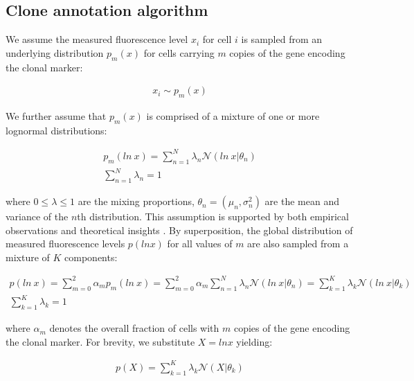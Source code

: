 \documentclass[10pt,letterpaper]{article}
\begin{document}
\subsection*{Clone annotation algorithm} 

We assume the measured fluorescence level $x_i$ for cell $i$ is sampled from an underlying distribution $p_m(x)$ for cells carrying $m$ copies of the gene encoding the clonal marker:
\begin{linenomath} \begin{gather}
x_i \sim p_m(x)
\end{gather} \end{linenomath}
We further assume that $p_m(x)$ is comprised of a mixture of one or more lognormal distributions:
\begin{linenomath} \begin{gather}
p_m(ln\ x) = \sum^{N}_{n=1}\lambda_n \mathcal{N}(ln\ x|\theta_{n}) \\
\sum^{N}_{n=1}\lambda_n = 1
\end{gather} \end{linenomath}
where $0 \leq \lambda \leq 1$ are the mixing proportions, $\theta_n=(\mu_n,\sigma_n^2)$ are the mean and variance of the $n$th distribution. This assumption is supported by both empirical observations and theoretical insights \cite{Furusawa2005,Beal2017}. By superposition, the global distribution of measured fluorescence levels $p(ln x)$ for all values of $m$ are also sampled from a mixture of $K$ components:
\begin{linenomath} \begin{gather}
p(ln\ x) =  \sum^{2}_{m=0} \alpha_m p_m(ln\ x) = \sum^{2}_{m=0} \alpha_m
\sum^{N}_{n=1}\lambda_n \mathcal{N}(ln\ x|\theta_{n}) = \sum^{K}_{k=1}\lambda_k \mathcal{N}(ln\ x|\theta_{k}) \\
\sum^{K}_{k=1}\lambda_k=1
\end{gather} \end{linenomath}
where $\alpha_m$ denotes the overall fraction of cells with $m$ copies of the gene encoding the clonal marker. For brevity, we substitute $X = ln x$ yielding:
\begin{linenomath} \begin{gather}
p(X) = \sum^{K}_{k=1}\lambda_k \mathcal{N}(X|\theta_{k})
\end{gather} \end{linenomath}
\end{document}

